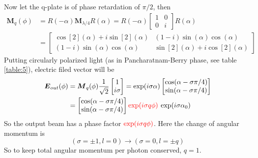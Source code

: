 \documentclass[11pt,a4paper]{article}
\numberwithin{equation}{section}
\begin{document}
Now let the q-plate is of phase retardation of $\pi/2$, then 
\begin{align}
	\boldsymbol{M}_q(\phi)&=R(-\alpha)\boldsymbol{M}_{\lambda/4}R(\alpha) 
	=R(-\alpha)
	\begin{bmatrix}
		1 & 0\\
		0 & i
	\end{bmatrix}
	R(\alpha)\nonumber\\
	&=\begin{bmatrix}
		\cos[2](\alpha)+i\sin[2](\alpha)&(1-i)\sin(\alpha)\cos(\alpha) \\ 
		(1-i)\sin(\alpha)\cos(\alpha) & \sin[2](\alpha)+i\cos[2](\alpha)
	\end{bmatrix}
\end{align}
Putting circularly polarized light (as in Pancharatnam-Berry phase, see table \ref{table:5}), electric filed vector will be
\begin{align}
	\boldsymbol{E}_{out}(\phi) &= \boldsymbol{M}_q(\phi)\frac{1}{\sqrt{2}}
	\begin{bmatrix}
		1\\
		i\sigma
	\end{bmatrix}
	= \exp(i\sigma\alpha)
	\begin{bmatrix}
		\cos(\alpha - \sigma\pi/4)\\
		\sin(\alpha - \sigma\pi/4)
	\end{bmatrix}\nonumber\\
	&=\begin{bmatrix}
		\cos(\alpha - \sigma\pi/4)\\
		\sin(\alpha - \sigma\pi/4)
	\end{bmatrix}
	{\color{red}\exp(i\sigma q\phi)}\:\exp(i\sigma\alpha_0)
\end{align}
So the output beam has a phase factor ${\color{red}\exp(i\sigma q\phi)}$. Here the change of angular momentum is 
$$(\sigma=\pm1,l=0)\longrightarrow (\sigma=0,l=\pm q)$$
So to keep total angular momentum per photon conserved, $q=1$.
\end{document}
